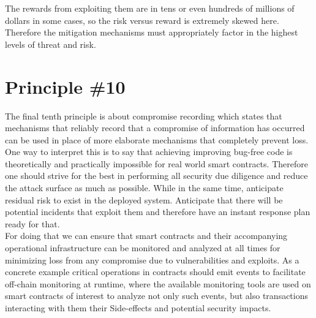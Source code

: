 The rewards from exploiting them are in tens or even hundreds of millions of dollars in some cases, so the risk versus reward is extremely skewed here. Therefore the mitigation mechanisms must appropriately factor in the highest levels of threat and risk.

\section{Principle \#10}

The final tenth principle is about compromise recording which states that mechanisms that reliably record that a compromise of information has occurred can be used in place of more elaborate mechanisms that completely prevent loss.\\

One way to interpret this is to say that achieving improving bug-free code is theoretically and practically impossible for real world smart contracts. Therefore one should strive for the best in performing all security due diligence and reduce the attack surface as much as possible. While in the same time, anticipate residual risk to exist in the deployed system. Anticipate that there will be potential incidents that exploit them and therefore have an instant response plan ready for that.\\

For doing that we can ensure that smart contracts and their accompanying operational infrastructure can be monitored and analyzed at all times for minimizing loss from any compromise due to vulnerabilities and exploits. As a concrete example critical operations in contracts should emit events to facilitate off-chain monitoring at runtime, where the available monitoring tools are used on smart contracts of interest to analyze not only such events, but also transactions interacting with them their Side-effects and potential security impacts.

